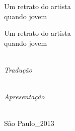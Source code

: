 
{\centering\vspace*{12em}\thispagestyle{empty}
{\huge Um retrato do artista\\ quando jovem\par}}

\cleardoublepage

{\centering\vspace*{12em}\thispagestyle{empty}
{\huge Um retrato do artista\\ quando jovem\par}\bigskip
{\Large{}}

\vspace*{12em}
{}\\
{\small\textit{Tradução}}\medskip

{\normalsize{}}\\
{\small\textit{Apresentação}}\bigskip

\vfill

\logoum\\
{\normalsize São Paulo\_2013}\par}

\clearpage

